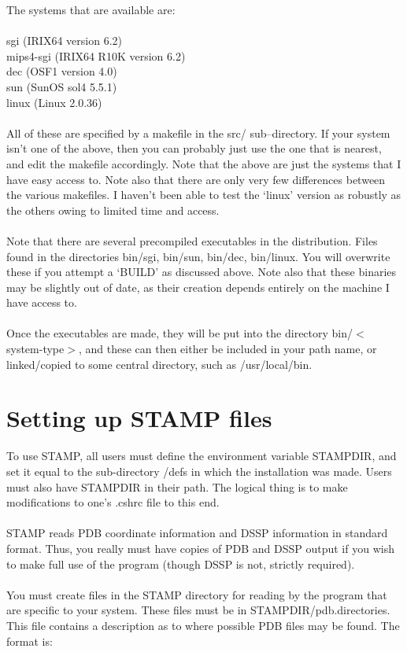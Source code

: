 The systems that are available are:\\
\\
sgi (IRIX64 version 6.2)\\
mips4-sgi (IRIX64 R10K version 6.2)\\
dec (OSF1 version 4.0)\\
sun (SunOS sol4 5.5.1)\\
linux (Linux 2.0.36)\\
\\
All of these are specified by a makefile in the src/ sub--directory.  If your system
isn't one of the above, then you can probably just use the one that is nearest, and edit
the makefile accordingly.  Note that the above are just the systems that I have easy access to. 
Note also that there are only very few differences between the various makefiles.  I haven't
been able to test the `linux' version as robustly as the others owing to limited time and access.\\
\\
Note that there are several precompiled executables in the distribution.  Files
found in the directories bin/sgi, bin/sun, bin/dec, bin/linux.  You will
overwrite these if you attempt a `BUILD' as discussed above.  Note also that these binaries
may be slightly out of date, as their creation depends entirely on 
the machine I have access to.\\
\\
Once the executables are made, they 
will be put into the directory bin/$<$system-type$>$, and these can then either be
included in your path name, or linked/copied to some central 
directory, such as /usr/local/bin.

\section{Setting up STAMP files}

To use STAMP, all users must define the environment variable
STAMPDIR, and set it equal to the sub-directory /defs in which 
the installation was made.  Users must also have STAMPDIR in their path. 
The logical thing is to make modifications to one's .cshrc file to
this end.\\
\\
STAMP reads PDB coordinate information and DSSP information in
standard format.  Thus, you really must have copies of PDB
and DSSP output if you wish to make full use of the program
(though DSSP is not, strictly required).\\
\\
You must create files in the STAMP directory for reading by the 
program that are specific to your system.  These files must be in
STAMPDIR/pdb.directories.   This file contains a description as to
where possible PDB files may be found.  The format is:\\

